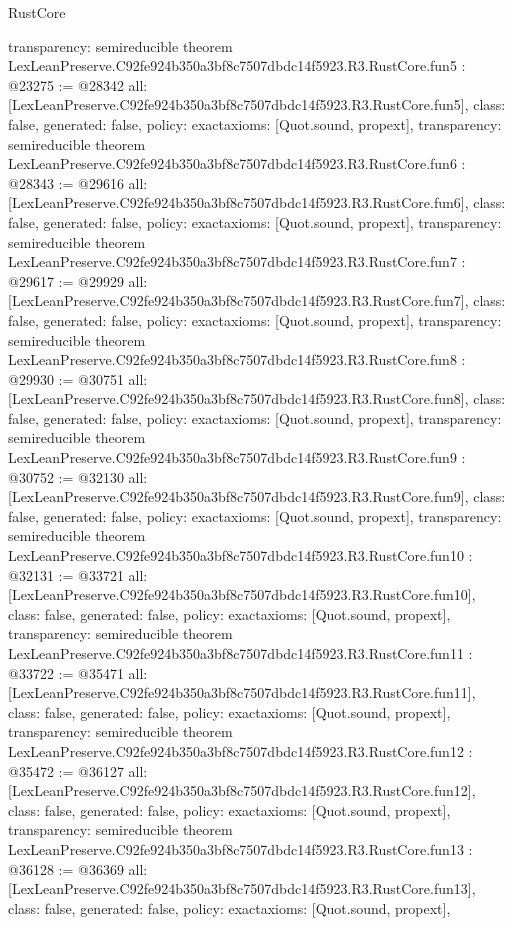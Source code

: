 \begin{lexlean}{RustCore}
\begin{coremodule}
{  transparency: semireducible
}
theorem LexLeanPreserve.C92fe924b350a3bf8c7507dbdc14f5923.R3.RustCore.fun5 : @23275 := @28342 {
  all: [LexLeanPreserve.C92fe924b350a3bf8c7507dbdc14f5923.R3.RustCore.fun5],
  class: false,
  generated: false,
  policy: exact{axioms: [Quot.sound, propext]},
  transparency: semireducible
}
theorem LexLeanPreserve.C92fe924b350a3bf8c7507dbdc14f5923.R3.RustCore.fun6 : @28343 := @29616 {
  all: [LexLeanPreserve.C92fe924b350a3bf8c7507dbdc14f5923.R3.RustCore.fun6],
  class: false,
  generated: false,
  policy: exact{axioms: [Quot.sound, propext]},
  transparency: semireducible
}
theorem LexLeanPreserve.C92fe924b350a3bf8c7507dbdc14f5923.R3.RustCore.fun7 : @29617 := @29929 {
  all: [LexLeanPreserve.C92fe924b350a3bf8c7507dbdc14f5923.R3.RustCore.fun7],
  class: false,
  generated: false,
  policy: exact{axioms: [Quot.sound, propext]},
  transparency: semireducible
}
theorem LexLeanPreserve.C92fe924b350a3bf8c7507dbdc14f5923.R3.RustCore.fun8 : @29930 := @30751 {
  all: [LexLeanPreserve.C92fe924b350a3bf8c7507dbdc14f5923.R3.RustCore.fun8],
  class: false,
  generated: false,
  policy: exact{axioms: [Quot.sound, propext]},
  transparency: semireducible
}
theorem LexLeanPreserve.C92fe924b350a3bf8c7507dbdc14f5923.R3.RustCore.fun9 : @30752 := @32130 {
  all: [LexLeanPreserve.C92fe924b350a3bf8c7507dbdc14f5923.R3.RustCore.fun9],
  class: false,
  generated: false,
  policy: exact{axioms: [Quot.sound, propext]},
  transparency: semireducible
}
theorem LexLeanPreserve.C92fe924b350a3bf8c7507dbdc14f5923.R3.RustCore.fun10 : @32131 := @33721 {
  all: [LexLeanPreserve.C92fe924b350a3bf8c7507dbdc14f5923.R3.RustCore.fun10],
  class: false,
  generated: false,
  policy: exact{axioms: [Quot.sound, propext]},
  transparency: semireducible
}
theorem LexLeanPreserve.C92fe924b350a3bf8c7507dbdc14f5923.R3.RustCore.fun11 : @33722 := @35471 {
  all: [LexLeanPreserve.C92fe924b350a3bf8c7507dbdc14f5923.R3.RustCore.fun11],
  class: false,
  generated: false,
  policy: exact{axioms: [Quot.sound, propext]},
  transparency: semireducible
}
theorem LexLeanPreserve.C92fe924b350a3bf8c7507dbdc14f5923.R3.RustCore.fun12 : @35472 := @36127 {
  all: [LexLeanPreserve.C92fe924b350a3bf8c7507dbdc14f5923.R3.RustCore.fun12],
  class: false,
  generated: false,
  policy: exact{axioms: [Quot.sound, propext]},
  transparency: semireducible
}
theorem LexLeanPreserve.C92fe924b350a3bf8c7507dbdc14f5923.R3.RustCore.fun13 : @36128 := @36369 {
  all: [LexLeanPreserve.C92fe924b350a3bf8c7507dbdc14f5923.R3.RustCore.fun13],
  class: false,
  generated: false,
  policy: exact{axioms: [Quot.sound, propext]},
}
\end{coremodule}
\end{lexlean}
